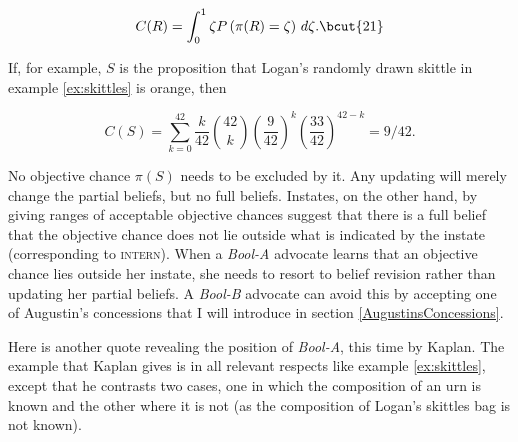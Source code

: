 \documentclass[11pt]{article}
\newcommand{\anderson}[0]{\textit{Bool-A}}
\newcommand{\augustin}[0]{\textit{Bool-B}}
\begin{document}
\begin{equation}
  \label{eq:s2}
  C(R)=\int_{0}^{1}\zeta{}P\left(\pi(R)=\zeta\right)\,d\zeta{}.\bcut{21}
\end{equation}

{\noindent}If, for example, $S$ is the proposition that Logan's
randomly drawn skittle in example \ref{ex:skittles} is orange, then

\begin{equation}
  \label{eq:skit}
  C(S)=\sum_{k=0}^{42}\frac{k}{42}\binom{42}{k}\left(\frac{9}{42}\right)^{k}\left(\frac{33}{42}\right)^{42-k}=9/42.
\end{equation}

No objective chance $\pi(S)$ needs to be excluded by it. Any updating
will merely change the partial beliefs, but no full beliefs. Instates,
on the other hand, by giving ranges of acceptable objective chances
suggest that there is a full belief that the objective chance does not
lie outside what is indicated by the instate (corresponding to
\textsc{intern}). When a {\anderson} advocate learns that an objective
chance lies outside her instate, she needs to resort to belief
revision rather than updating her partial beliefs. A {\augustin}
advocate can avoid this by accepting one of Augustin's concessions
that I will introduce in section \ref{AugustinsConcessions}.

Here is another quote revealing the position of {\anderson}, this
time by Kaplan. The example that Kaplan gives is in all relevant
respects like example \ref{ex:skittles}, except that he contrasts two
cases, one in which the composition of an urn is known and the other
where it is not (as the composition of Logan's skittles bag is not
known).
\end{document}
